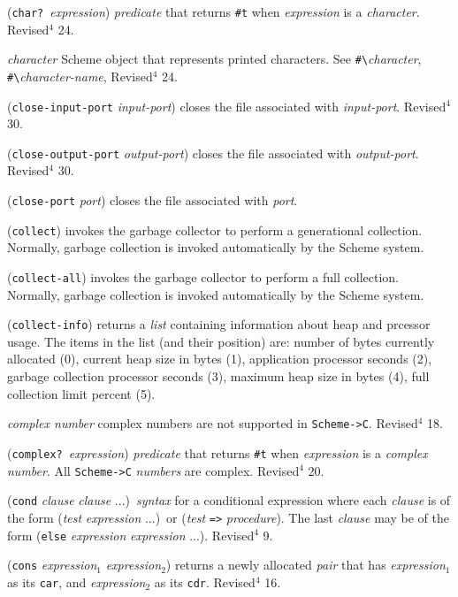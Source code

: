 \documentclass[10pt,twocolumn]{article}
\begin{document}
(\texttt{char?}\ \emph{expression}) \emph{predicate} that returns \texttt{\#t}
when \emph{expression} is a \emph{character}.  Revised$^4$ 24.

\emph{character} Scheme object that represents printed characters.  See
\texttt{\#\textbackslash}\emph{character}, \texttt{\#\textbackslash}\emph{character-name}, Revised$^4$ 24.

(\texttt{close-input-port} \emph{input-port}) closes the file associated with
\emph{input-port}. Revised$^4$ 30.

(\texttt{close-output-port} \emph{output-port}) closes the file associated
with \emph{output-port}.  Revised$^4$ 30.

(\texttt{close-port} \emph{port}) closes the file associated with \emph{port}.

(\texttt{collect}) invokes the garbage collector to perform a generational
collection.  Normally, garbage collection is invoked automatically by
the Scheme system.

(\texttt{collect-all}) invokes the garbage collector to perform a
full collection.  Normally, garbage collection is invoked
automatically by the Scheme system.

(\texttt{collect-info}) returns a \emph{list} containing information about
heap and prcessor usage.  The items in the list (and their position)
are: number of bytes currently allocated (0), current heap size in
bytes (1), application processor seconds (2), garbage collection
processor seconds (3), maximum heap size in bytes (4), full
collection limit percent (5).

\emph{complex number} complex numbers are not supported in \texttt{Scheme->C}.
Revised$^4$ 18.

(\texttt{complex?}\ \emph{expression}) \emph{predicate} that returns \texttt{\#t} when
\emph{expression} is a \emph{complex number}.  All \texttt{Scheme->C} \emph{numbers}
are complex. Revised$^4$ 20.

(\texttt{cond} \emph{clause} \emph{clause} ...)\ \emph{syntax} for a conditional
expression where each \emph{clause} is of the form (\emph{test}
\emph{expression} ...)\ or (\emph{test} \texttt{=>} \emph{procedure}).  The last
\emph{clause} may be of the form (\texttt{else} \emph{expression} \emph{expression}
 ...).  Revised$^4$ 9.

(\texttt{cons} \emph{expression}$_1$ \emph{expression}$_2$) returns a newly
allocated \emph{pair} that has \emph{expression}$_1$ as its \texttt{car}, and
\emph{expression}$_2$ as its \texttt{cdr}. Revised$^4$ 16.
\end{document}
